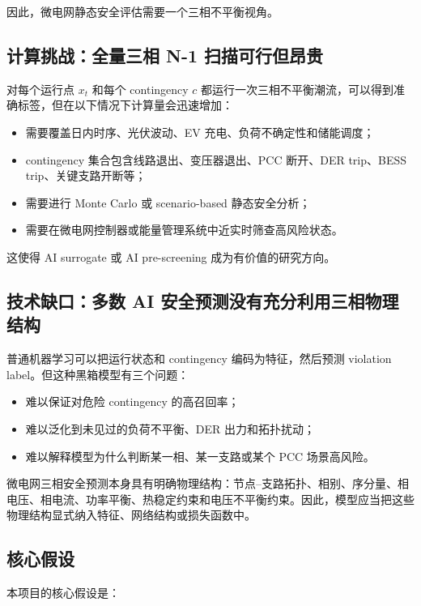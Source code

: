 \documentclass[UTF8,11pt]{ctexart}
\begin{document}
因此，微电网静态安全评估需要一个三相不平衡视角。

\subsection{计算挑战：全量三相 N-1 扫描可行但昂贵}

对每个运行点 $x_t$ 和每个 contingency $c$ 都运行一次三相不平衡潮流，可以得到准确标签，但在以下情况下计算量会迅速增加：

\begin{itemize}
    \item 需要覆盖日内时序、光伏波动、EV 充电、负荷不确定性和储能调度；
    \item contingency 集合包含线路退出、变压器退出、PCC 断开、DER trip、BESS trip、关键支路开断等；
    \item 需要进行 Monte Carlo 或 scenario-based 静态安全分析；
    \item 需要在微电网控制器或能量管理系统中近实时筛查高风险状态。
\end{itemize}

这使得 AI surrogate 或 AI pre-screening 成为有价值的研究方向。

\subsection{技术缺口：多数 AI 安全预测没有充分利用三相物理结构}

普通机器学习可以把运行状态和 contingency 编码为特征，然后预测 violation label。但这种黑箱模型有三个问题：

\begin{itemize}
    \item 难以保证对危险 contingency 的高召回率；
    \item 难以泛化到未见过的负荷不平衡、DER 出力和拓扑扰动；
    \item 难以解释模型为什么判断某一相、某一支路或某个 PCC 场景高风险。
\end{itemize}

微电网三相安全预测本身具有明确物理结构：节点--支路拓扑、相别、序分量、相电压、相电流、功率平衡、热稳定约束和电压不平衡约束。因此，模型应当把这些物理结构显式纳入特征、网络结构或损失函数中。

\subsection{核心假设}

本项目的核心假设是：
\end{document}
